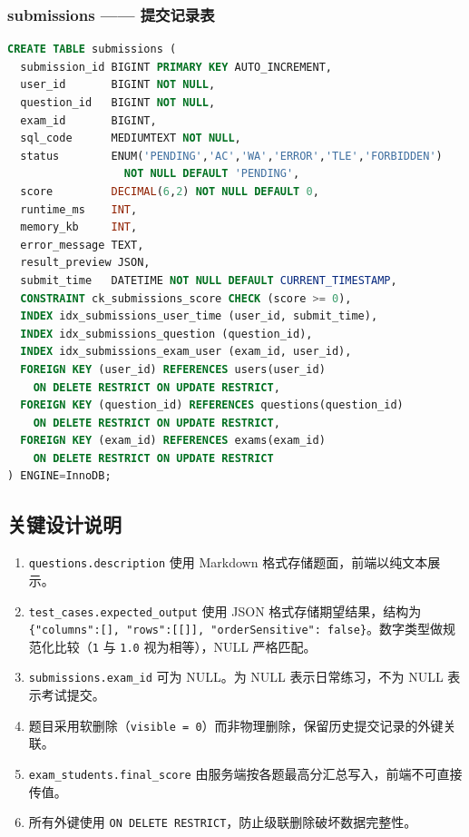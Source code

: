 \documentclass[12pt,a4paper]{ctexart}
\begin{document}
\subsubsection*{submissions —— 提交记录表}

\begin{lstlisting}[language=SQL]
CREATE TABLE submissions (
  submission_id BIGINT PRIMARY KEY AUTO_INCREMENT,
  user_id       BIGINT NOT NULL,
  question_id   BIGINT NOT NULL,
  exam_id       BIGINT,
  sql_code      MEDIUMTEXT NOT NULL,
  status        ENUM('PENDING','AC','WA','ERROR','TLE','FORBIDDEN')
                  NOT NULL DEFAULT 'PENDING',
  score         DECIMAL(6,2) NOT NULL DEFAULT 0,
  runtime_ms    INT,
  memory_kb     INT,
  error_message TEXT,
  result_preview JSON,
  submit_time   DATETIME NOT NULL DEFAULT CURRENT_TIMESTAMP,
  CONSTRAINT ck_submissions_score CHECK (score >= 0),
  INDEX idx_submissions_user_time (user_id, submit_time),
  INDEX idx_submissions_question (question_id),
  INDEX idx_submissions_exam_user (exam_id, user_id),
  FOREIGN KEY (user_id) REFERENCES users(user_id)
    ON DELETE RESTRICT ON UPDATE RESTRICT,
  FOREIGN KEY (question_id) REFERENCES questions(question_id)
    ON DELETE RESTRICT ON UPDATE RESTRICT,
  FOREIGN KEY (exam_id) REFERENCES exams(exam_id)
    ON DELETE RESTRICT ON UPDATE RESTRICT
) ENGINE=InnoDB;
\end{lstlisting}

\subsection{关键设计说明}

\begin{enumerate}[leftmargin=2em]
  \item \texttt{questions.description} 使用 Markdown 格式存储题面，前端以纯文本展示。
  \item \texttt{test\_cases.expected\_output} 使用 JSON 格式存储期望结果，结构为 \texttt{\{"columns":[], "rows":[[]], "orderSensitive": false\}}。数字类型做规范化比较（\texttt{1} 与 \texttt{1.0} 视为相等），NULL 严格匹配。
  \item \texttt{submissions.exam\_id} 可为 NULL。为 NULL 表示日常练习，不为 NULL 表示考试提交。
  \item 题目采用软删除（\texttt{visible = 0}）而非物理删除，保留历史提交记录的外键关联。
  \item \texttt{exam\_students.final\_score} 由服务端按各题最高分汇总写入，前端不可直接传值。
  \item 所有外键使用 \texttt{ON DELETE RESTRICT}，防止级联删除破坏数据完整性。
\end{enumerate}
\end{document}
